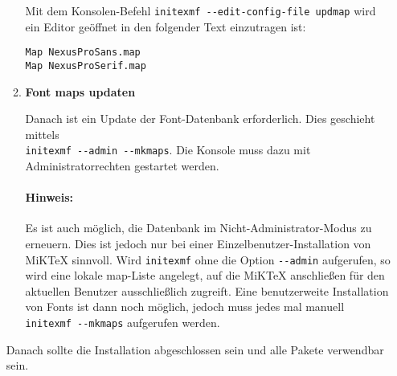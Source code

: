 \documentclass[12pt]{scrartcl}
\begin{document}
\begin{enumerate}
\begin{enumerate}
      Mit dem Konsolen-Befehl \lstinline{initexmf --edit-config-file updmap}
      wird ein Editor geöffnet in den folgender Text einzutragen ist:

      \begin{lstlisting}
Map NexusProSans.map
Map NexusProSerif.map
      \end{lstlisting}

      \item {\bfseries Font maps updaten}

        Danach ist ein Update der Font-Datenbank erforderlich. Dies geschieht
        mittels\\ \lstinline{initexmf --admin --mkmaps}. Die Konsole muss dazu
        mit Administratorrechten gestartet werden.
        
        \paragraph{Hinweis:} Es ist auch möglich, die Datenbank im 
          Nicht-Administrator-Modus zu erneu\-ern. Dies ist jedoch nur bei einer
          Einzelbenutzer-Installation von MiKTeX sinnvoll. Wird
          \lstinline{initexmf} ohne die Option \lstinline{--admin} aufgerufen,
          so wird eine lokale map-Liste angelegt, auf die MiKTeX anschließen für
          den aktuellen Benutzer ausschließlich zugreift.
          Eine benutzerweite Installation von Fonts ist dann noch 
          möglich, jedoch muss jedes mal manuell \lstinline{initexmf --mkmaps}
          aufgerufen werden.
    \end{enumerate}
    
    Danach sollte die Installation abgeschlossen sein und alle Pakete verwendbar 
    sein.
\end{enumerate}
\end{document}
